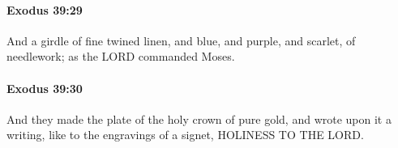 		\paragraph{Exodus 39:29} %
			\label{EXODUS-39-29}

			And a girdle of fine twined linen, and blue, and purple, and scarlet, of needlework; as the LORD commanded Moses.


		\paragraph{Exodus 39:30} %
			\label{EXODUS-39-30}

			And they made the plate of the holy crown of pure gold, and wrote upon it a writing, like to the engravings of a signet, HOLINESS TO THE LORD.


